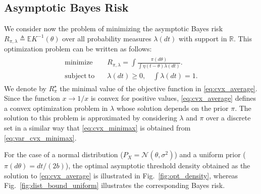 \documentclass[letterpaper, conference, 11pt]{IEEEtran}      %
\begin{document}
\subsection{Asymptotic Bayes Risk}
 We consider now the problem of minimizing the asymptotic Bayes risk $
R_{\pi,\lambda} \triangleq \mathbb E  K^{-1}(\theta)$ over all probability measures $\lambda(dt)$ with support in $\mathbb R$. This optimization problem can be written as follows:
\begin{align}
\label{eq:cvx_average}
\begin{split}
\mathrm{minimize} \quad & R_{\pi,\lambda} =  \int \frac{\pi(d\theta)}{ \int \eta \left( t-\theta\right) \lambda(dt)}. \\ 
\mathrm{subject~to} \quad & \lambda(dt)\geq 0,\quad \int \lambda(dt) =1. 
\end{split}
\end{align}
We denote by $R^\star_{\pi}$ the minimal value of the objective function in \eqref{eq:cvx_average}. Since the function $x \rightarrow 1/x$ is convex for positive values, \eqref{eq:cvx_average} defines a convex optimization problem in $\lambda$ whose solution depends on the prior $\pi$. The solution to this problem is approximated by considering $\lambda$ and $\pi$ over a discrete set in a similar way that \eqref{eq:cvx_minimax} is obtained from \eqref{eq:var_cvx_minimax}. \par
For the case of a normal distribution ($P_X = \mathcal N(\theta, \sigma^2)$) and a uniform prior ( $\pi(d\theta) =dt/(2b)$), the optimal asymptotic threshold density obtained as the solution to \eqref{eq:cvx_average} is illustrated in Fig.~\ref{fig:opt_density}, whereas Fig.~\ref{fig:dist_bound_uniform} illustrates the corresponding Bayes risk. 
\par
%
\end{document}
